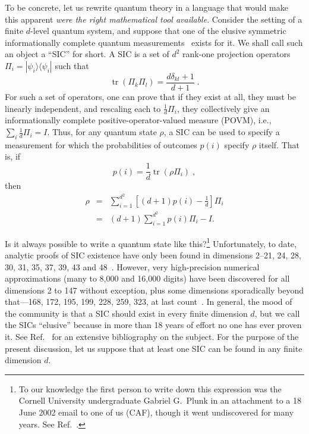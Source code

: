 \documentclass[aps,pra,superscriptaddress,10pt,tightenlines,twocolumn,nofootinbib]{revtex4}
\theoremstyle{remark}
\newcommand{\be}{\begin{equation}}
\newcommand{\ee}{\end{equation}}
\DeclareMathOperator{\Tr}{tr}
\begin{document}
To be concrete, let us rewrite quantum theory in a language that would make this apparent {\it were the right mathematical tool available}.  Consider the setting of a finite $d$-level quantum system, and suppose that one of the elusive symmetric informationally complete quantum measurements~\cite{zauner1999,renes2004} exists for it.  We shall call such an object a ``SIC'' for short.  A SIC is a set of $d^2$ rank-one projection operators $\Pi_i=|\psi_i\rangle\langle\psi_i|$ such that
\begin{equation}
\Tr (\Pi_k \Pi_l) = \frac{d\delta_{kl} + 1}{d + 1}\;.
\label{eq:SICOverlaps}
\end{equation}
For such a set of operators, one can prove that if they exist at all, they must be linearly independent, and rescaling each to $\frac{1}{d}\Pi_i$, they collectively give an informationally complete positive-operator-valued measure (POVM), i.e., $\sum_i\frac{1}{d}\Pi_i=I$.  Thus, for any quantum state $\rho$, a SIC can be used to specify a measurement for which the probabilities of outcomes $p(i)$ specify $\rho$ itself.  That is, if
\be
p(i) = \frac{1}{d} \Tr(\rho \Pi_i)\;,
\label{eq:SicProbabilities}
\ee
then
\begin{eqnarray}
\rho
 &=& \sum_{i=1}^{d^2} \left[(d+1) p(i) - \frac{1}{d}\right]\! \Pi_i \label{eq:rhoTermsProbs}\\
 &=& (d + 1) \sum_{i=1}^{d^2} p(i) \Pi_i - I.
\end{eqnarray}

Is it always possible to write a quantum state like this?\footnote{To
  our knowledge the first person to write down this expression was the
  Cornell University undergraduate Gabriel G.\ Plunk in an attachment
  to a 18 June 2002 email to one of us (CAF), though it went
  undiscovered for many years. See
  Ref.~\cite[pp.\ 472--474]{Fuchs2014}.}  Unfortunately, to date,
analytic proofs of SIC existence have only been found in dimensions
2--21, 24, 28, 30, 31, 35, 37, 39, 43 and 48~\cite{appleby2016,
  applebyprivate}.  However, very high-precision numerical
approximations (many to 8,000 and 16,000 digits) have been discovered
for all dimensions 2 to 147 without exception, plus some dimensions
sporadically beyond that---168, 172, 195, 199, 228, 259,
323, at last count~\cite{scott2010, scottprivate, hoangprivate}.  In
general, the mood of the community is that a SIC should exist in every
finite dimension $d$, but we call the SICs ``elusive'' because in more
than 18 years of effort no one has ever proven it.  See
Ref.~\cite{Galois} for an extensive bibliography on the subject.  For
the purpose of the present discussion, let us suppose that at least
one SIC can be found in any finite dimension $d$.
\end{document}
